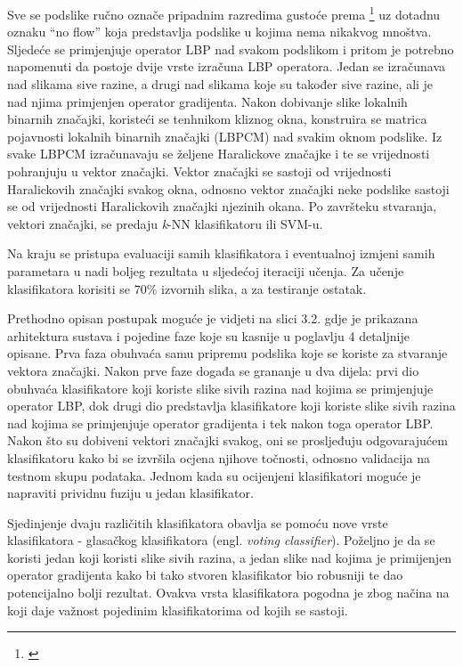 \documentclass[times, utf8, zavrsni]{fer}
\begin{document}
Sve se podslike ručno označe pripadnim razredima gustoće prema
\footnote{\cite{polus}} uz dotadnu oznaku \enquote{no flow} koja 
predstavlja podslike u kojima nema nikakvog mnoštva. Sljedeće se primjenjuje
operator LBP nad svakom podslikom i pritom je potrebno napomenuti da
 postoje dvije vrste izračuna LBP operatora. Jedan se izračunava nad slikama 
sive razine, a drugi nad slikama koje su također sive razine, ali je nad njima 
primjenjen operator gradijenta. Nakon dobivanje slike lokalnih binarnih 
značajki, koristeći se tenhnikom kliznog okna, konstruira se matrica 
pojavnosti lokalnih binarnih značajki (LBPCM) nad svakim oknom podslike. 
Iz svake LBPCM izračunavaju se željene Haralickove značajke i te se vrijednosti
pohranjuju u vektor značajki. Vektor značajki se sastoji od vrijednosti
Haralickovih značajki svakog okna, odnosno vektor značajki neke podslike 
sastoji se od vrijednosti Haralickovih značajki njezinih okana. Po završteku 
stvaranja, vektori značajki, se predaju \textit{k}-NN klasifikatoru ili SVM-u.

\newpage

Na kraju se pristupa evaluaciji samih klasifikatora i eventualnoj izmjeni
samih parametara u nadi boljeg rezultata u sljedećoj iteraciji učenja. Za učenje
klasifikatora korisiti se \(70\%\) izvornih slika, a za testiranje ostatak.

\bigbreak

Prethodno opisan postupak moguće je vidjeti na slici 3.2. gdje je
prikazana arhitektura sustava i pojedine faze koje su kasnije u poglavlju 4 
detaljnije opisane. Prva faza obuhvaća samu pripremu podslika koje se 
koriste za stvaranje vektora značajki. Nakon prve faze događa se grananje
u dva dijela: prvi dio obuhvaća klasifikatore koji koriste slike sivih razina 
nad kojima se primjenjuje operator LBP, dok drugi dio predstavlja klasifikatore
koji koriste slike sivih razina nad kojima se primjenjuje operator gradijenta
i tek nakon toga operator LBP. Nakon što su dobiveni vektori značajki 
svakog, oni se prosljeđuju odgovarajućem klasifikatoru kako bi se izvršila
ocjena njihove točnosti, odnosno validacija na testnom skupu podataka.
Jednom kada su ocijenjeni klasifikatori moguće je napraviti prividnu 
fuziju u jedan klasifikator.

\bigbreak

Sjedinjenje dvaju različitih klasifikatora obavlja se pomoću nove vrste
klasifikatora - glasačkog klasifikatora (engl. \textit{voting classifier}).
Poželjno je da se koristi jedan koji koristi slike sivih razina, a jedan 
slike nad kojima je primijenjen operator gradijenta kako bi tako
stvoren klasifikator bio robusniji te dao potencijalno bolji rezultat.
Ovakva vrsta klasifikatora pogodna je zbog načina na koji daje važnost pojedinim
klasifikatorima od kojih se sastoji. 
\end{document}
